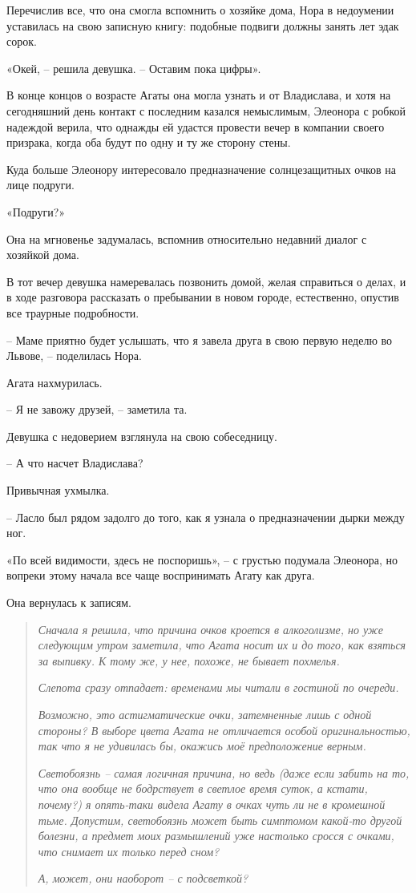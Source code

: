 \documentclass[
  a5paperpaper,
  DIV=11,
  numbers=noendperiod]{scrreprt}
\begin{document}
Перечислив все, что она смогла вспомнить о хозяйке дома, Нора в
недоумении уставилась на свою записную книгу: подобные подвиги должны
занять лет эдак сорок.

«Окей, -- решила девушка. -- Оставим пока цифры».

В конце концов о возрасте Агаты она могла узнать и от Владислава, и хотя
на сегодняшний день контакт с последним казался немыслимым, Элеонора с
робкой надеждой верила, что однажды ей удастся провести вечер в компании
своего призрака, когда оба будут по одну и ту же сторону стены.

Куда больше Элеонору интересовало предназначение солнцезащитных очков на
лице подруги.

«Подруги?»

Она на мгновенье задумалась, вспомнив относительно недавний диалог с
хозяйкой дома.

В тот вечер девушка намеревалась позвонить домой, желая справиться о
делах, и в ходе разговора рассказать о пребывании в новом городе,
естественно, опустив все траурные подробности.

-- Маме приятно будет услышать, что я завела друга в свою первую неделю
во Львове, -- поделилась Нора.

Агата нахмурилась.

-- Я не завожу друзей, -- заметила та.

Девушка с недоверием взглянула на свою собеседницу.

-- А что насчет Владислава?

Привычная ухмылка.

-- Ласло был рядом задолго до того, как я узнала о предназначении дырки
между ног.

«По всей видимости, здесь не поспоришь», -- с грустью подумала Элеонора,
но вопреки этому начала все чаще воспринимать Агату как друга.

Она вернулась к записям.

\begin{quote}
\emph{Сначала я решила, что причина очков кроется в алкоголизме, но уже
следующим утром заметила, что Агата носит их и до того, как взяться за
выпивку. К тому же, у нее, похоже, не бывает похмелья.}

\emph{Слепота сразу отпадает: временами мы читали в гостиной по
очереди.}

\emph{Возможно, это астигматические очки, затемненные лишь с одной
стороны? В выборе цвета Агата не отличается особой оригинальностью, так
что я не удивилась бы, окажись моё предположение верным.}

\emph{Светобоязнь -- самая логичная причина, но ведь (даже если забить
на то, что она вообще не бодрствует в светлое время суток, а кстати,
почему?) я опять-таки видела Агату в очках чуть ли не в кромешной тьме.
Допустим, светобоязнь может быть симптомом какой-то другой болезни, а
предмет моих размышлений уже настолько сросся с очками, что снимает их
только перед сном?}

\emph{А, может, они наоборот -- с подсветкой?}
\end{quote}
\end{document}
